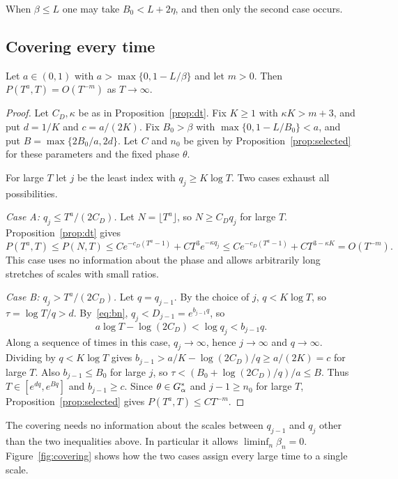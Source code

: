 When $\beta\le L$ one may take $B_0<L+2\eta$, and then only the second case occurs.

\subsection{Covering every time}

\begin{lemma}\label{lem:covering}
Let $a\in(0,1)$ with $a>\max\{0,1-L/\beta\}$ and let $m>0$. Then $P(T^a,T)=O(T^{-m})$ as $T\to\infty$.
\end{lemma}

\begin{proof}
Let $C_D,\kappa$ be as in Proposition~\ref{prop:dt}. Fix $K\ge1$ with $\kappa K>m+3$, and put $d=1/K$ and $c=a/(2K)$. Fix $B_0>\beta$ with $\max\{0,1-L/B_0\}<a$, and put $B=\max\{2B_0/a,2d\}$. Let $C$ and $n_0$ be given by Proposition~\ref{prop:selected} for these parameters and the fixed phase $\theta$.

For large $T$ let $j$ be the least index with $q_j\ge K\log T$. Two cases exhaust all possibilities.

\emph{Case A: $q_j\le T^a/(2C_D)$.} Let $N=\lfloor T^a\rfloor$, so $N\ge C_Dq_j$ for large $T$. Proposition~\ref{prop:dt} gives
\[
P(T^a,T)\le P(N,T)\le Ce^{-c_D(T^a-1)}+CT^3e^{-\kappa q_j}\le Ce^{-c_D(T^a-1)}+CT^{3-\kappa K}=O(T^{-m}).
\]
This case uses no information about the phase and allows arbitrarily long stretches of scales with small ratios.

\emph{Case B: $q_j>T^a/(2C_D)$.} Let $q=q_{j-1}$. By the choice of $j$, $q<K\log T$, so $\tau=\log T/q>d$. By~\eqref{eq:bn}, $q_j<D_{j-1}=e^{b_{j-1}q}$, so
\[
a\log T-\log(2C_D)<\log q_j<b_{j-1}q.
\]
Along a sequence of times in this case, $q_j\to\infty$, hence $j\to\infty$ and $q\to\infty$. Dividing by $q<K\log T$ gives $b_{j-1}>a/K-\log(2C_D)/q\ge a/(2K)=c$ for large $T$. Also $b_{j-1}\le B_0$ for large $j$, so $\tau<(B_0+\log(2C_D)/q)/a\le B$. Thus $T\in[e^{dq},e^{Bq}]$ and $b_{j-1}\ge c$. Since $\theta\in G_\alpha^*$ and $j-1\ge n_0$ for large $T$, Proposition~\ref{prop:selected} gives $P(T^a,T)\le CT^{-m}$.
\end{proof}

The covering needs no information about the scales between $q_{j-1}$ and $q_j$ other than the two inequalities above. In particular it allows $\liminf_n\beta_n=0$. Figure~\ref{fig:covering} shows how the two cases assign every large time to a single scale.

